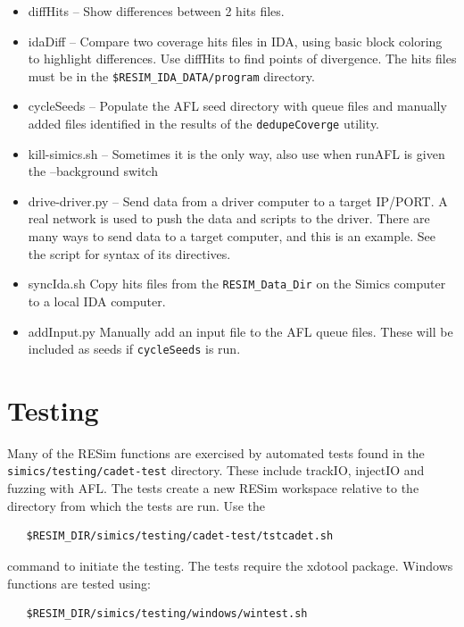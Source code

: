 \documentclass[titlepage]{article}
\begin{document}
\begin{itemize}
\item diffHits -- Show differences between 2 hits files.
\item idaDiff -- Compare two coverage hits files in IDA, using basic block coloring to highlight differences.  Use diffHits to find points
of divergence.  The hits files must be in the {\tt \$RESIM\_IDA\_DATA/program} directory.
\item cycleSeeds -- Populate the AFL seed directory with queue files and manually added files identified in the results of the {\tt dedupeCoverge} utility.
\item kill-simics.sh -- Sometimes it is the only way, also use when runAFL is given the --background switch
\item drive-driver.py -- Send data from a driver computer to a target IP/PORT.  A real network is used to push the data and scripts
to the driver.  There are many ways to send data to a target computer, and this is an example.  See the script for syntax of its directives.
\item syncIda.sh Copy hits files from the {\tt RESIM\_Data\_Dir} on the Simics computer to a local IDA computer.
\item addInput.py Manually add an input file to the AFL queue files.  These will be included as seeds if {\tt cycleSeeds} is run.
\end{itemize}

\section{Testing}
Many of the RESim functions are exercised by automated tests found in the {\tt simics/testing/cadet-test} directory.
These include trackIO, injectIO and fuzzing with AFL.  The tests create a new RESim workspace relative to
the directory from which the tests are run.  Use the
\begin{verbatim}
   $RESIM_DIR/simics/testing/cadet-test/tstcadet.sh
\end{verbatim}
\noindent command to initiate the testing.  The tests require the xdotool package.
Windows functions are tested using:
\begin{verbatim}
   $RESIM_DIR/simics/testing/windows/wintest.sh
\end{verbatim}
\end{document}
